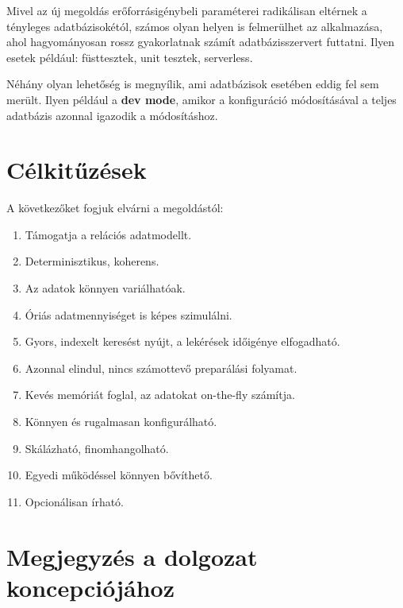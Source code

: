\documentclass[
    parspace,
    noindent,
    nohyp,
]{elteiktdk}[2023/04/10]
\newcommand{\todoref}[1]{\todo[inline, noinlinepar, color=red, textcolor=white, inlinewidth=0.6cm, caption={#1}]{\large \textbf{×}}}
\begin{document}
Mivel az új megoldás erőforrásigénybeli paraméterei
radikálisan eltérnek a tényleges adatbázisokétól,
számos olyan helyen is felmerülhet az alkalmazása,
ahol hagyományosan rossz gyakorlatnak számít adatbázisszervert futtatni.
Ilyen esetek például: füsttesztek, unit tesztek, serverless.

Néhány olyan lehetőség is megnyílik, ami adatbázisok esetében eddig fel sem merült.
Ilyen például a \textbf{dev mode}, amikor a konfiguráció módosításával a teljes adatbázis
azonnal igazodik a módosításhoz. \todoref{dev-mode, zero-mode (az on-demand schema részt is ehhez igazítani)}

\section{Célkitűzések}

A következőket fogjuk elvárni a megoldástól:

\begin{enumerate}
    \setlength\itemsep{-1em}
    \item Támogatja a relációs adatmodellt.
    \item Determinisztikus, koherens.
    \item Az adatok könnyen variálhatóak.
    \item Óriás adatmennyiséget is képes szimulálni.
    \item Gyors, indexelt keresést nyújt, a lekérések időigénye elfogadható.
    \item Azonnal elindul, nincs számottevő preparálási folyamat.
    \item Kevés memóriát foglal, az adatokat on-the-fly számítja.
    \item Könnyen és rugalmasan konfigurálható.
    \item Skálázható, finomhangolható.
    \item Egyedi működéssel könnyen bővíthető.
    \item Opcionálisan írható.
\end{enumerate}

\section{Megjegyzés a dolgozat koncepciójához}
\end{document}
